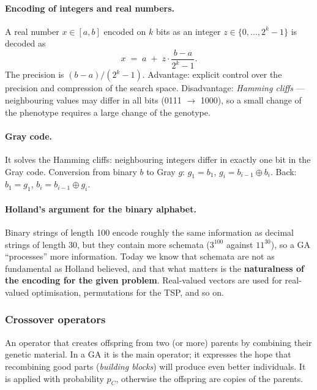 \documentclass[11pt,a4paper]{article}
\theoremstyle{definition}
\providecommand{\uv}[1]{``#1''}
\begin{document}
\paragraph{Encoding of integers and real numbers.} A real number $x \in [a,b]$
encoded on $k$ bits as an integer $z \in \{0,\dots,2^k-1\}$ is decoded as
\[
x \;=\; a \;+\; z \cdot \frac{b-a}{2^k - 1}.
\]
The precision is $(b-a)/(2^k-1)$. Advantage: explicit control over the precision
and compression of the search space. Disadvantage: \emph{Hamming cliffs} ---
neighbouring values may differ in all bits (0111 $\to$ 1000), so a small change
of the phenotype requires a large change of the genotype.

\paragraph{Gray code.} It solves the Hamming cliffs: neighbouring integers
differ in exactly one bit in the Gray code. Conversion from binary $b$ to Gray
$g$: $g_1 = b_1$, $g_i = b_{i-1} \oplus b_i$. Back: $b_1 = g_1$,
$b_i = b_{i-1} \oplus g_i$.

\paragraph{Holland's argument for the binary alphabet.} Binary strings of length
100 encode roughly the same information as decimal strings of length 30, but
they contain more schemata ($3^{100}$ against $11^{30}$), so a GA
\uv{processes} more information. Today we know that schemata are not as
fundamental as Holland believed, and that what matters is the
\textbf{naturalness of the encoding for the given problem}. Real-valued vectors
are used for real-valued optimisation, permutations for the TSP, and so on.

\subsubsection{Crossover operators}

\begin{defbox}
An operator that creates offspring from two (or more) parents by combining their
genetic material. In a GA it is the main operator; it expresses the hope that
recombining good parts (\emph{building blocks}) will produce even better
individuals. It is applied with probability $p_C$, otherwise the offspring are
copies of the parents.
\end{defbox}
\end{document}
